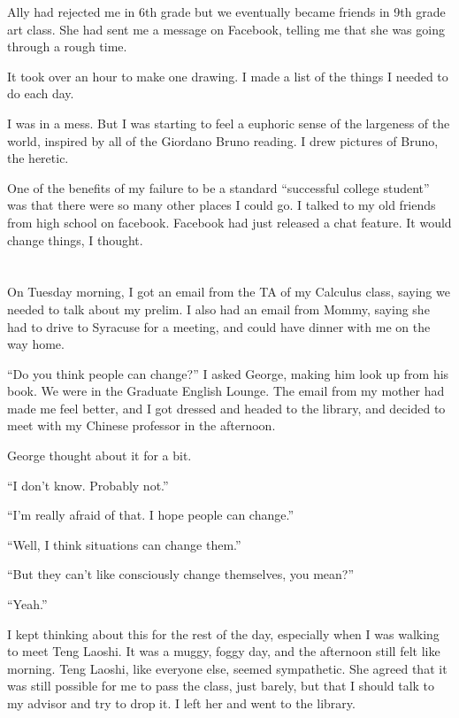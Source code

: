 Ally had rejected me in 6th grade but we eventually became friends in 9th grade
art class.  She had sent me a message on Facebook, telling me that she was going
through a rough time.

It took over an hour to make one drawing.  I made a list of the things I needed
to do each day.

I was in a mess.  But I was starting to feel a euphoric sense of the largeness
of the world, inspired by all of the Giordano Bruno reading.  I drew pictures of
Bruno, the heretic. 

One of the benefits of my failure to be a standard ``successful college
student''  was that there were so many other places I could go.  I talked to my
old friends from high school on facebook.  Facebook had just released a chat
feature.  It would change things, I thought.

\section{}

On Tuesday morning, I got an email from the TA of my Calculus class, saying we
needed to talk about my prelim.  I also had an email from Mommy, saying she had
to drive to Syracuse for a meeting, and could have dinner with me on the way
home.  

``Do you think people can change?'' I asked George, making him look up from his
book.  We were in the Graduate English Lounge.  The email from my mother had
made me feel better, and I got dressed and headed to the library, and decided to
meet with my Chinese professor in the afternoon.

George thought about it for a bit.

``I don't know.  Probably not.''

``I'm really afraid of that.  I hope people can change.''

``Well, I think situations can change them.''

``But they can't like consciously change themselves, you mean?''

``Yeah.''

I kept thinking about this for the rest of the day, especially when I was
walking to meet Teng Laoshi.  It was a muggy, foggy day, and the afternoon still
felt like morning.  Teng Laoshi, like everyone else, seemed sympathetic.  She
agreed that it was still possible for me to pass the class, just barely, but
that I should talk to my advisor and try to drop it.  I left her and went to the
library.

